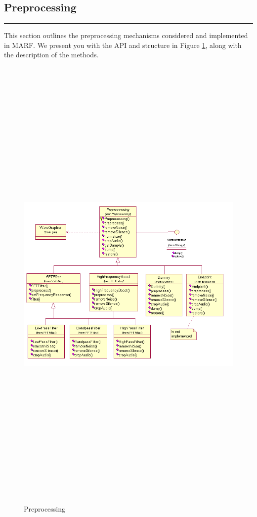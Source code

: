 \subsection{Preprocessing}\label{sect:preprocessing}
\noindent
\rule{7.0in}{.013in}

This section outlines the preprocessing mechanisms considered
and implemented in MARF. We present you with the API and structure in Figure \ref{fig:preprocessing}, along with
the description of the methods.

\begin{figure}
	\centering
	\includegraphics[angle=90,height=660pt]{../graphics/arch/preprocessing.png}
	\caption{Preprocessing}
	\label{fig:preprocessing}
\end{figure}














